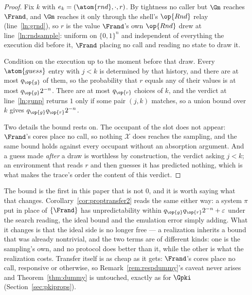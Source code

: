 \documentclass[10pt,oneside,openany]{book}
\theoremstyle{accentdef}
\theoremstyle{accentplain}
\begin{document}
\begin{proof}
Fix $k$ with $e_k = (\atom{rnd},\cdot,r)$. By tightness no caller but $\Gm$
reaches $\Frand$, and $\Gm$ reaches it only through the shell's $\op{Rnd}$ relay
(line~\ref{ln:grnd}), so $r$ is the value $\Frand$'s own $\op{Rnd}$ drew at
line~\ref{ln:rndsample}: uniform on $\{0,1\}^{n}$ and independent of everything
the execution did before it, $\Frand$ placing no call and reading no state to draw it.

Condition on the execution up to the moment before that draw. Every $\atom{guess}$ entry with $j <
k$ is determined by that history, and there are at most $q_{\op{g}}$ of them, so the probability
that $r$ equals any of their values is at most $q_{\op{g}} 2^{-n}$. There are at most $q_{\op{r}}$
choices of $k$, and the verdict at line~\ref{ln:gunp} returns $1$ only if some pair $(j,k)$
matches, so a union bound over $k$ gives $q_{\op{g}} q_{\op{r}} 2^{-n}$.

Two details the bound rests on. The occupant of the slot does not appear: $\Frand$'s cores place
no call, so nothing $\mathcal{X}$ does reaches the sampling, and the same bound holds against
every occupant without an absorption argument. And a guess made \emph{after} a draw is worthless
by construction, the verdict asking $j < k$; an environment that reads $r$ and then guesses
it has predicted nothing, which is what makes the trace's order the content of this verdict.
\end{proof}

The bound is the first in this paper that is not $0$, and it is worth saying what that changes.
Corollary~\ref{cor:proptransfer2} reads the same either way: a system $\pi$ put in place of
$\{\Frand\}$ has unpredictability within $q_{\op{g}} q_{\op{r}} 2^{-n} + \varepsilon$ under the
search reading, the ideal bound and the emulation error simply adding. What it changes is that the
ideal side is no longer free --- a realization inherits a bound that was already nontrivial, and
the two terms are of different kinds: one is the sampling's own, and no protocol does better than
it, while the other is what the realization costs. Transfer itself is as cheap as it gets:
$\Frand$'s cores place no call, responsive or otherwise, so Remark~\ref{rem:respdummy}'s caveat
never arises and Theorem~\ref{thm:dummy} is untouched, exactly as for $\Gpki$
(Section~\ref{sec:pkiprops}).

\end{document}

